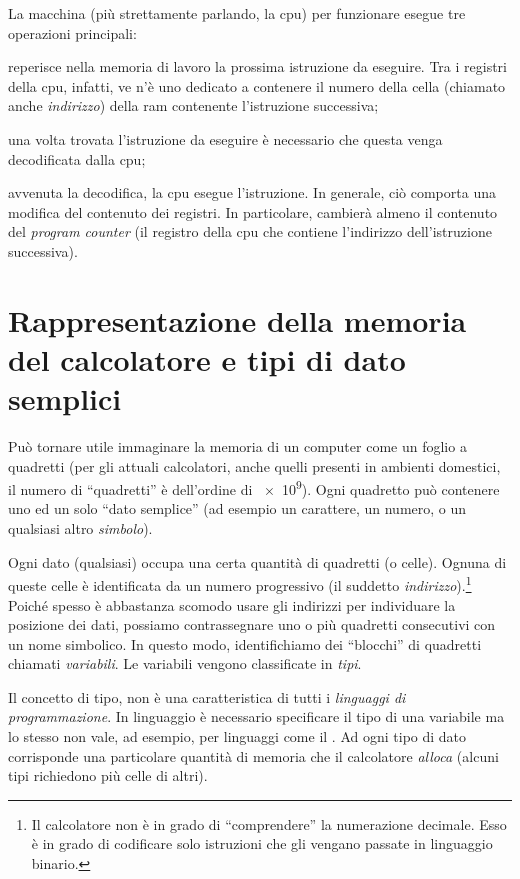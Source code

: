 La  macchina (più strettamente parlando, la \ac{cpu}) per funzionare esegue tre operazioni principali:
\begin{description}[]
	\item
[Fetch\index{fetch}] reperisce nella memoria di lavoro la prossima istruzione da eseguire. Tra i registri della \ac{cpu}, infatti, ve n'è uno dedicato a contenere il numero della cella (chiamato anche \emph{indirizzo}) della \ac{ram} contenente l'istruzione successiva;
	\item
[Decode\index{decode}] una volta trovata l'istruzione da eseguire è necessario che questa venga decodificata dalla \ac{cpu};
	\item
[Execute\index{execute}] avvenuta la decodifica, la \ac{cpu} esegue l'istruzione. In generale, ciò comporta una modifica del contenuto dei registri. In particolare, cambierà almeno il contenuto del \emph{program counter} (il registro della \ac{cpu} che contiene l'indirizzo dell'istruzione successiva).
\end{description}

	\section{Rappresentazione della memoria del calcolatore e tipi di dato semplici}
	\label{sec:mem}
Può tornare utile immaginare la memoria di un computer come un foglio a quadretti (per gli attuali calcolatori, anche quelli presenti in ambienti domestici, il numero di ``quadretti'' è dell'ordine di \num{e9}). Ogni quadretto può contenere uno ed un solo ``dato semplice'' (ad esempio un carattere, un numero, o un qualsiasi altro \emph{simbolo}).

Ogni dato (qualsiasi) occupa una certa quantità di quadretti (o celle).
Ognuna di queste celle è identificata da un numero progressivo (il suddetto \emph{indirizzo}).\footnote{Il calcolatore non è in grado di ``comprendere'' la numerazione decimale. Esso è in grado di codificare solo istruzioni che gli vengano passate in linguaggio binario.}
Poiché spesso è abbastanza scomodo usare gli indirizzi per individuare la posizione dei dati, possiamo contrassegnare uno o più quadretti consecutivi con un nome simbolico.
In questo modo, identifichiamo dei ``blocchi'' di quadretti  chiamati \emph{variabili}. Le variabili vengono classificate in \emph{tipi}.

Il concetto di tipo, non è una caratteristica di tutti i \emph{linguaggi di programmazione}.
In linguaggio  è necessario specificare il tipo di una variabile ma lo stesso non vale, ad esempio, per linguaggi come il .
Ad ogni tipo di dato corrisponde una particolare quantità di memoria che il calcolatore \emph{alloca} (alcuni tipi richiedono più celle di altri).

